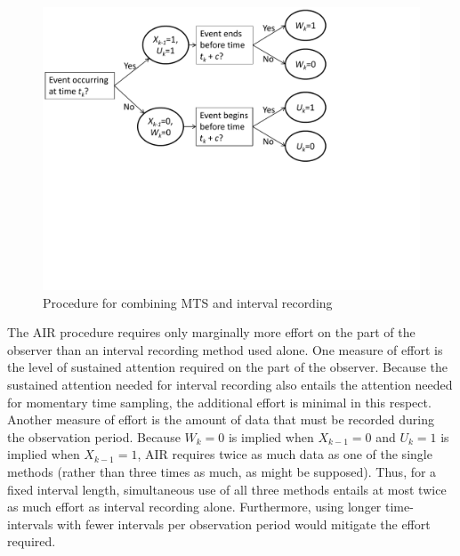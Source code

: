 \documentclass[man, noextraspace, floatsintext]{apa6}\usepackage[]{graphicx}\usepackage[]{color}
\begin{document}
\begin{figure}[hbtp]
\centering
\includegraphics[clip=true, trim= 0 240 150 00, width=0.8\linewidth]{AIR_flowchart.pdf}
\caption{Procedure for combining MTS and interval recording}
\label{fig:questions}
\end{figure}  

The AIR procedure requires only marginally more effort on the part of the observer than an interval recording method used alone. 
One measure of effort is the level of sustained attention required on the part of the observer. Because the sustained attention needed for interval recording also entails the attention needed for momentary time sampling, the additional effort is minimal in this respect.
Another measure of effort is the amount of data that must be recorded during the observation period. Because $W_k = 0$ is implied when $X_{k-1} = 0$ and $U_k = 1$ is implied when $X_{k-1} = 1$, AIR requires twice as much data as one of the single methods (rather than three times as much, as might be supposed). 
Thus, for a fixed interval length, simultaneous use of all three methods entails at most twice as much effort as interval recording alone. 
Furthermore, using longer time-intervals with fewer intervals per observation period would mitigate the effort required.
\end{document}
